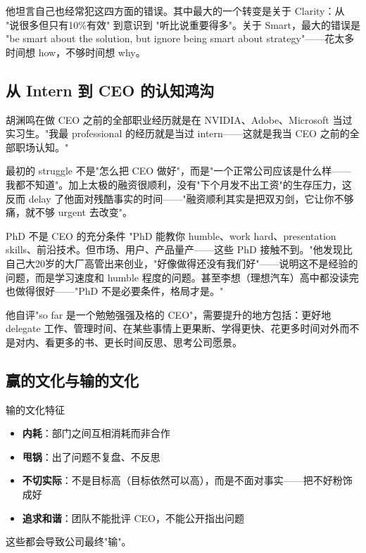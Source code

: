 \documentclass[a4paper]{article}
\begin{document}
他坦言自己也经常犯这四方面的错误。其中最大的一个转变是关于 Clarity：从 "说很多但只有10\%有效" 到意识到 "听比说重要得多"。关于 Smart，最大的错误是 "be smart about the solution, but ignore being smart about strategy"——花太多时间想 how，不够时间想 why。

\subsection{从 Intern 到 CEO 的认知鸿沟}

胡渊鸣在做 CEO 之前的全部职业经历就是在 NVIDIA、Adobe、Microsoft 当过实习生。"我最 professional 的经历就是当过 intern——这就是我当 CEO 之前的全部职场认知。"

最初的 struggle 不是"怎么把 CEO 做好"，而是"一个正常公司应该是什么样——我都不知道"。加上太极的融资很顺利，没有"下个月发不出工资"的生存压力，这反而 delay 了他面对残酷事实的时间——"融资顺利其实是把双刃剑，它让你不够痛，就不够 urgent 去改变"。

\begin{knowledgebox}{PhD 不是 CEO 的充分条件}
"PhD 能教你 humble、work hard、presentation skills、前沿技术。但市场、用户、产品量产——这些 PhD 接触不到。"他发现比自己大20岁的大厂高管出来创业，"好像做得还没有我们好"——说明这不是经验的问题，而是学习速度和 humble 程度的问题。甚至李想（理想汽车）高中都没读完也做得很好——"PhD 不是必要条件，格局才是。"
\end{knowledgebox}

他自评"so far 是一个勉勉强强及格的 CEO"，需要提升的地方包括：更好地 delegate 工作、管理时间、在某些事情上更果断、学得更快、花更多时间对外而不是对内、看更多的书、更长时间反思、思考公司愿景。

\subsection{赢的文化与输的文化}

\begin{warningbox}{输的文化特征}
\begin{itemize}
\item \textbf{内耗}：部门之间互相消耗而非合作
\item \textbf{甩锅}：出了问题不复盘、不反思
\item \textbf{不切实际}：不是目标高（目标依然可以高），而是不面对事实——把不好粉饰成好
\item \textbf{追求和谐}：团队不能批评 CEO，不能公开指出问题
\end{itemize}
这些都会导致公司最终"输"。
\end{warningbox}
\end{document}
